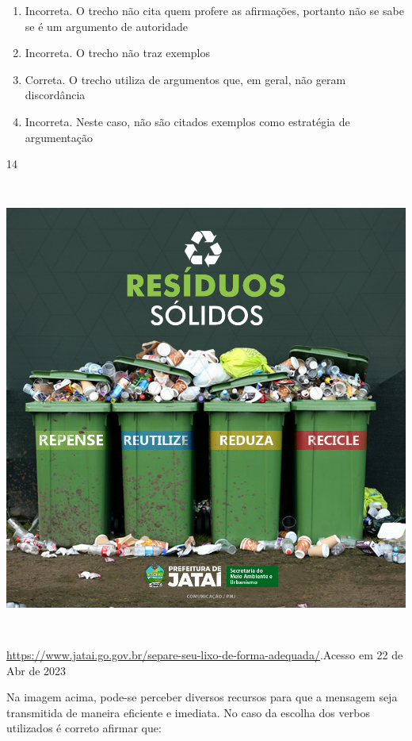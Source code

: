 {{\begin{escolha}
{\begin{itemize}
\begin{itemize}
\begin{enumerate}
\def\labelenumi{\arabic{enumi}.}
\item
  Incorreta. O trecho não cita quem profere as afirmações, portanto não
  se sabe se é um argumento de autoridade
\item
  Incorreta. O trecho não traz exemplos
\item
  Correta. O trecho utiliza de argumentos que, em geral, não geram
  discordância
\item
  Incorreta. Neste caso, não são citados exemplos como estratégia de
  argumentação
\end{enumerate}

\num{14}

\includegraphics[width=5.90551in,height=5.90278in]{./imgSAEB_7_POR/media/image19.png}

\href{https://www.jatai.go.gov.br/separe-seu-lixo-de-forma-adequada/}{\uline{https://www.jatai.go.gov.br/separe-seu-lixo-de-forma-adequada/}}.Acesso
em 22 de Abr de 2023

Na imagem acima, pode-se perceber diversos recursos para que a mensagem
seja transmitida de maneira eficiente e imediata. No caso da escolha dos
verbos utilizados é correto afirmar que:


\end{itemize}
\end{itemize}}
\end{escolha}}}
